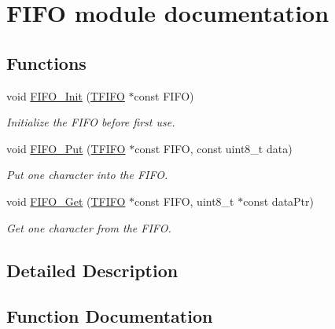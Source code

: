 \hypertarget{group___f_i_f_o__module}{}\section{F\+I\+F\+O module documentation}
\label{group___f_i_f_o__module}
\subsection*{Functions}
\begin{DoxyCompactItemize}
\item 
void \hyperlink{group___f_i_f_o__module_gad9207f49ab9ed061b6dca6063112ca60}{F\+I\+F\+O\+\_\+\+Init} (\hyperlink{struct_t_f_i_f_o}{T\+F\+I\+F\+O} $\ast$const F\+I\+F\+O)
\begin{DoxyCompactList}\small\item\em Initialize the F\+I\+F\+O before first use. \end{DoxyCompactList}\item 
void \hyperlink{group___f_i_f_o__module_gaee681f1a1e1fd5672ed23dca0929433a}{F\+I\+F\+O\+\_\+\+Put} (\hyperlink{struct_t_f_i_f_o}{T\+F\+I\+F\+O} $\ast$const F\+I\+F\+O, const uint8\+\_\+t data)
\begin{DoxyCompactList}\small\item\em Put one character into the F\+I\+F\+O. \end{DoxyCompactList}\item 
void \hyperlink{group___f_i_f_o__module_gabb3392ae9e1170a724586695ab0e5808}{F\+I\+F\+O\+\_\+\+Get} (\hyperlink{struct_t_f_i_f_o}{T\+F\+I\+F\+O} $\ast$const F\+I\+F\+O, uint8\+\_\+t $\ast$const data\+Ptr)
\begin{DoxyCompactList}\small\item\em Get one character from the F\+I\+F\+O. \end{DoxyCompactList}\end{DoxyCompactItemize}


\subsection{Detailed Description}


\subsection{Function Documentation}
\hypertarget{group___f_i_f_o__module_gabb3392ae9e1170a724586695ab0e5808}{}

